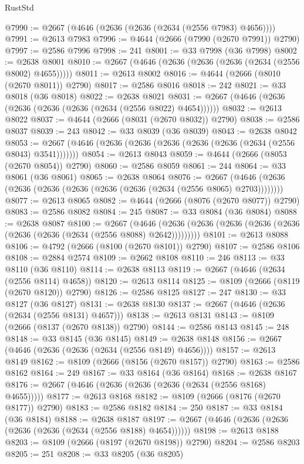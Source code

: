 \begin{lexlean}{RustStd}
\begin{coremodule}
@7990 := @2667 (@4646 (@2636 (@2636 (@2634 (@2556 @7983) @4656))))
@7991 := @2613 @7983
@7996 := @4644 (@2666 (@7990 (@2670 @7991)) @2790)
@7997 := @2586 @7996
@7998 := 241
@8001 := @33 @7998 (@36 @7998)
@8002 := @2638 @8001
@8010 := @2667 (@4646 (@2636 (@2636 (@2636 (@2634 (@2556 @8002) @4655)))))
@8011 := @2613 @8002
@8016 := @4644 (@2666 (@8010 (@2670 @8011)) @2790)
@8017 := @2586 @8016
@8018 := 242
@8021 := @33 @8018 (@36 @8018)
@8022 := @2638 @8021
@8031 := @2667 (@4646 (@2636 (@2636 (@2636 (@2636 (@2634 (@2556 @8022) @4654))))))
@8032 := @2613 @8022
@8037 := @4644 (@2666 (@8031 (@2670 @8032)) @2790)
@8038 := @2586 @8037
@8039 := 243
@8042 := @33 @8039 (@36 @8039)
@8043 := @2638 @8042
@8053 := @2667 (@4646 (@2636 (@2636 (@2636 (@2636 (@2636 (@2634 (@2556 @8043) @3541)))))))
@8054 := @2613 @8043
@8059 := @4644 (@2666 (@8053 (@2670 @8054)) @2790)
@8060 := @2586 @8059
@8061 := 244
@8064 := @33 @8061 (@36 @8061)
@8065 := @2638 @8064
@8076 := @2667 (@4646 (@2636 (@2636 (@2636 (@2636 (@2636 (@2636 (@2634 (@2556 @8065) @2703))))))))
@8077 := @2613 @8065
@8082 := @4644 (@2666 (@8076 (@2670 @8077)) @2790)
@8083 := @2586 @8082
@8084 := 245
@8087 := @33 @8084 (@36 @8084)
@8088 := @2638 @8087
@8100 := @2667
    (@4646 (@2636 (@2636 (@2636 (@2636 (@2636 (@2636 (@2636 (@2634 (@2556 @8088) @2642)))))))))
@8101 := @2613 @8088
@8106 := @4792 (@2666 (@8100 (@2670 @8101)) @2790)
@8107 := @2586 @8106
@8108 := @2884 @2574
@8109 := @2662 @8108
@8110 := 246
@8113 := @33 @8110 (@36 @8110)
@8114 := @2638 @8113
@8119 := @2667 (@4646 (@2634 (@2556 @8114) @4658))
@8120 := @2613 @8114
@8125 := @8109 (@2666 (@8119 (@2670 @8120)) @2790)
@8126 := @2586 @8125
@8127 := 247
@8130 := @33 @8127 (@36 @8127)
@8131 := @2638 @8130
@8137 := @2667 (@4646 (@2636 (@2634 (@2556 @8131) @4657)))
@8138 := @2613 @8131
@8143 := @8109 (@2666 (@8137 (@2670 @8138)) @2790)
@8144 := @2586 @8143
@8145 := 248
@8148 := @33 @8145 (@36 @8145)
@8149 := @2638 @8148
@8156 := @2667 (@4646 (@2636 (@2636 (@2634 (@2556 @8149) @4656))))
@8157 := @2613 @8149
@8162 := @8109 (@2666 (@8156 (@2670 @8157)) @2790)
@8163 := @2586 @8162
@8164 := 249
@8167 := @33 @8164 (@36 @8164)
@8168 := @2638 @8167
@8176 := @2667 (@4646 (@2636 (@2636 (@2636 (@2634 (@2556 @8168) @4655)))))
@8177 := @2613 @8168
@8182 := @8109 (@2666 (@8176 (@2670 @8177)) @2790)
@8183 := @2586 @8182
@8184 := 250
@8187 := @33 @8184 (@36 @8184)
@8188 := @2638 @8187
@8197 := @2667 (@4646 (@2636 (@2636 (@2636 (@2636 (@2634 (@2556 @8188) @4654))))))
@8198 := @2613 @8188
@8203 := @8109 (@2666 (@8197 (@2670 @8198)) @2790)
@8204 := @2586 @8203
@8205 := 251
@8208 := @33 @8205 (@36 @8205)

\end{coremodule}
\end{lexlean}
